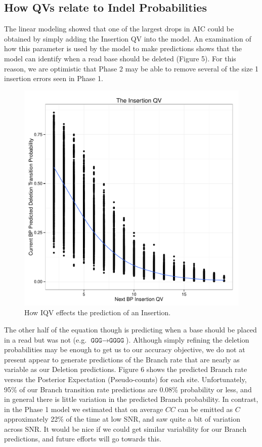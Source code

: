 \documentclass[DIV=calc, paper=a4, fontsize=11pt, twocolumn]{scrartcl}	 %
\begin{document}
\subsection*{How QVs relate to Indel Probabilities}

The linear modeling showed that one of the largest drops in AIC could be obtained by simply adding the Insertion QV into the model.  An examination of how this parameter is used by the model to make predictions shows that the model can identify when a read base should be deleted (Figure 5).  For this reason, we are optimistic that Phase 2 may be able to remove several of the size 1 insertion errors seen in Phase 1.

\begin{figure}[ht]
\includegraphics[width=\linewidth]{IQV}
\caption{How IQV effects the prediction of an Insertion.}
\end{figure}

The other half of the equation though is predicting when a base should be placed in a read but was not (e.g. $\texttt{GGG} \rightarrow \texttt{GGGG}$).  Although simply refining the deletion probabilities may be enough to get us to our accuracy objective, we do not at present appear to generate predictions of the Branch rate that are nearly as variable as our Deletion predictions.  Figure 6 shows the predicted Branch rate versus the Posterior Expectation (Pseudo-counts) for each site.  Unfortunately, 95\% of our Branch transition rate predictions are 0.08\% probability or less, and in general there is little variation in the predicted Branch probability.  In contrast, in the Phase 1 model we estimated that on average $CC$ can be emitted as $C$ approximately 22\% of the time at low SNR, and saw quite a bit of variation across SNR.  It would be nice if we could get similar variability for our Branch predictions, and future efforts will go towards this.
\end{document}
